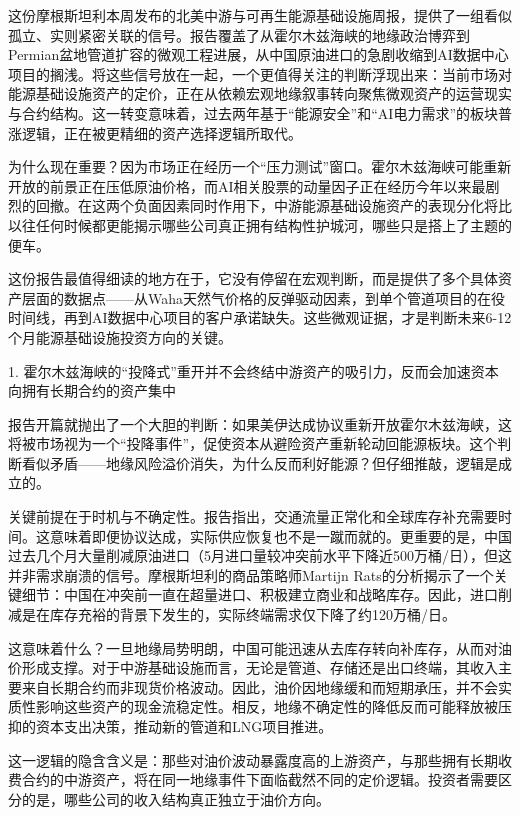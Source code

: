 \documentclass[11pt]{ctexart}
\begin{document}
这份摩根斯坦利本周发布的北美中游与可再生能源基础设施周报，提供了一组看似孤立、实则紧密关联的信号。报告覆盖了从霍尔木兹海峡的地缘政治博弈到Permian盆地管道扩容的微观工程进展，从中国原油进口的急剧收缩到AI数据中心项目的搁浅。将这些信号放在一起，一个更值得关注的判断浮现出来：当前市场对能源基础设施资产的定价，正在从依赖宏观地缘叙事转向聚焦微观资产的运营现实与合约结构。这一转变意味着，过去两年基于“能源安全”和“AI电力需求”的板块普涨逻辑，正在被更精细的资产选择逻辑所取代。

为什么现在重要？因为市场正在经历一个“压力测试”窗口。霍尔木兹海峡可能重新开放的前景正在压低原油价格，而AI相关股票的动量因子正在经历今年以来最剧烈的回撤。在这两个负面因素同时作用下，中游能源基础设施资产的表现分化将比以往任何时候都更能揭示哪些公司真正拥有结构性护城河，哪些只是搭上了主题的便车。

这份报告最值得细读的地方在于，它没有停留在宏观判断，而是提供了多个具体资产层面的数据点——从Waha天然气价格的反弹驱动因素，到单个管道项目的在役时间线，再到AI数据中心项目的客户承诺缺失。这些微观证据，才是判断未来6-12个月能源基础设施投资方向的关键。

1. 霍尔木兹海峡的“投降式”重开并不会终结中游资产的吸引力，反而会加速资本向拥有长期合约的资产集中

报告开篇就抛出了一个大胆的判断：如果美伊达成协议重新开放霍尔木兹海峡，这将被市场视为一个“投降事件”，促使资本从避险资产重新轮动回能源板块。这个判断看似矛盾——地缘风险溢价消失，为什么反而利好能源？但仔细推敲，逻辑是成立的。

关键前提在于时机与不确定性。报告指出，交通流量正常化和全球库存补充需要时间。这意味着即便协议达成，实际供应恢复也不是一蹴而就的。更重要的是，中国过去几个月大量削减原油进口（5月进口量较冲突前水平下降近500万桶/日），但这并非需求崩溃的信号。摩根斯坦利的商品策略师Martijn Rats的分析揭示了一个关键细节：中国在冲突前一直在超量进口、积极建立商业和战略库存。因此，进口削减是在库存充裕的背景下发生的，实际终端需求仅下降了约120万桶/日。

这意味着什么？一旦地缘局势明朗，中国可能迅速从去库存转向补库存，从而对油价形成支撑。对于中游基础设施而言，无论是管道、存储还是出口终端，其收入主要来自长期合约而非现货价格波动。因此，油价因地缘缓和而短期承压，并不会实质性影响这些资产的现金流稳定性。相反，地缘不确定性的降低反而可能释放被压抑的资本支出决策，推动新的管道和LNG项目推进。

这一逻辑的隐含含义是：那些对油价波动暴露度高的上游资产，与那些拥有长期收费合约的中游资产，将在同一地缘事件下面临截然不同的定价逻辑。投资者需要区分的是，哪些公司的收入结构真正独立于油价方向。
\end{document}
